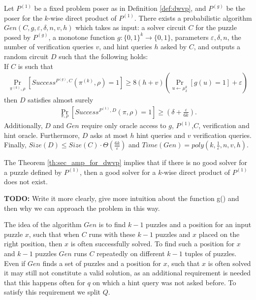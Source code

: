 \begin{theorem}
\label{th:sec_amp_for_dwvp}
Let $P^{(1)}$ be a fixed problem poser as in Definition \ref{def:dwvp}, and $P^{(g)}$ be the poser for the $k$-wise direct product of $P^{(1)}$.
There exists a probabilistic algorithm $Gen(C, g, \varepsilon, \delta, n, v, h)$ which takes as input: a solver circuit $C$ for the puzzle posed by $P^{(g)}$,
a monotone function $g:\{0,1\}^k \rightarrow \{0,1\}$, parameters $\varepsilon, \delta,n$,
the number of verification queries $v$, and hint queries $h$ asked by $C$, and outputs a random circuit $D$
such that the following holds: \\
If $C$ is such that \\
  \begin{align*}
    \underset{\pi^{(k)}, \rho}{\Pr}[Success^{P^{(g)}, C}(\pi^{(k)}, \rho) = 1] \geq 8(h+v)\left(\underset{u \leftarrow \mu_\delta^k}{\Pr}[g(u) = 1] + \varepsilon\right)
  \end{align*}
then $D$ satisfies almost surely
  \begin{align*}
    \underset{\pi, \rho}{\Pr}[Success^{P^{(1)},D}(\pi, \rho) = 1] \geq (\delta + \frac{\varepsilon}{6k}).
  \end{align*}
Additionally, $D$ and $Gen$ require only oracle access to $g$, $P^{(1)}$,$C$, verification and hint oracle.
Furthermore, $D$ asks at most $h$ hint queries and $v$ verification queries.
Finally, $Size(D) \leq Size(C) \cdot \Theta(\frac{6k}{\varepsilon})$ and $Time(Gen) = poly(k, \frac{1}{\varepsilon}, n, v, h)$.
\end{theorem}
%
%
The Theorem \ref{th:sec_amp_for_dwvp} implies that if there is no good solver for a puzzle defined by $P^{(1)}$, then a good solver for
a $k$-wise direct product of $P^{(1)}$ does not exist.

\begin{todo}
  \textbf{TODO:} Write it more clearly, give more intuition about the function g() and then why we can approach the problem in this way.
\end{todo}

The idea of the algorithm $Gen$ is to find $k-1$ puzzles and a position for an input puzzle $x$, such that
when $C$ runs with these $k-1$ puzzles and $x$ placed on the right position, then $x$ is often successfully solved.
To find such a position for $x$ and $k-1$ puzzles $Gen$ runs $C$ repeatedly on different $k-1$ tuples of puzzles.
Even if $Gen$ finds a set of puzzles and a position for $x$, such that $x$ is often solved it may still not
constitute a valid solution, as an additional requirement is needed that this happens often for $q$
on which a hint query was not asked before. To satisfy this requirement we split $Q$.
